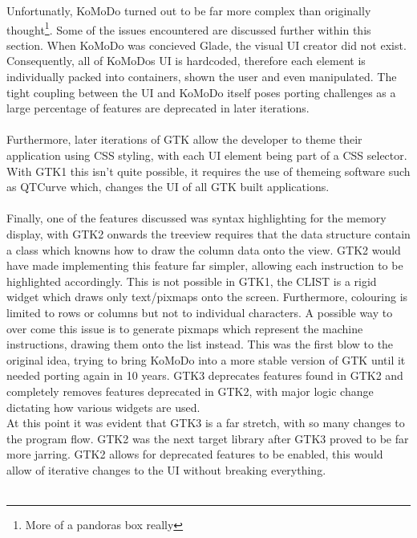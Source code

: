   Unfortunatly, KoMoDo turned out to be far more complex than originally thought\footnote{More of a pandoras box really}. Some of the issues encountered are discussed further within this section.
    When KoMoDo was concieved Glade, the visual UI creator did not exist. Consequently, all of KoMoDos UI is hardcoded, therefore each element is individually packed into containers, shown the user and even manipulated. The tight coupling between the UI and KoMoDo itself poses porting challenges as a large percentage of features are deprecated in later iterations.\\\\
    Furthermore, later iterations of GTK allow the developer to theme their application using CSS styling, with each UI element being part of a CSS selector. With GTK1 this isn't quite possible, it requires the use of themeing software such as QTCurve which, changes the UI of all GTK built applications.\\\\
    Finally, one of the features discussed was syntax highlighting for the memory display, with GTK2 onwards the treeview requires that the data structure contain a class which knowns how to draw the column data onto the view. GTK2 would have made implementing this feature far simpler, allowing each instruction to be highlighted accordingly. This is not possible in GTK1, the CLIST is a rigid widget which draws only text/pixmaps onto the screen. Furthermore, colouring is limited to rows or columns but not to individual characters. A possible way to over come this issue is to generate pixmaps which represent the machine instructions, drawing them onto the list instead.
    This was the first blow to the original idea, trying to bring KoMoDo into a more stable version of GTK until it needed porting again in 10 years. GTK3 deprecates features found in GTK2 and completely removes features deprecated in GTK2, with major logic change dictating how various widgets are used.\\
    At this point it was evident that GTK3 is a far stretch, with so many changes to the program flow.
    GTK2 was the next target library after GTK3 proved to be far more jarring. GTK2 allows for deprecated features to be enabled, this would allow of iterative changes to the UI without breaking everything.\\\\
